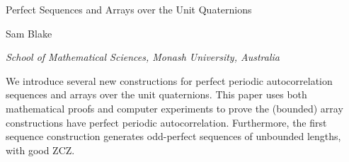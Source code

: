 \documentclass[12pt]{article}
\theoremstyle{definition}
\begin{document}
\centerline{{\LARGE Perfect Sequences and Arrays over the Unit Quaternions}}
\medskip
\centerline{\large Sam Blake}
\smallskip
\centerline{\large \it School of Mathematical Sciences, Monash University, Australia}
\bigskip
\bigskip
%
%
%

\def\ii{\textbf{\textit{i}}}
\def\jj{\textbf{\textit{j}}}
\def\kk{\textbf{\textit{k}}}

We introduce several new constructions for perfect periodic autocorrelation sequences and 
arrays over the unit quaternions. This paper 
uses both mathematical proofs and computer experiments to prove the (bounded) 
array constructions have perfect periodic autocorrelation. Furthermore, the first 
sequence construction generates odd-perfect sequences of unbounded lengths, 
with good ZCZ.\\
\end{document}
